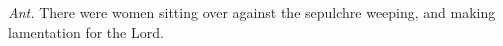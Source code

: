 \begin{Parallel}[v]{\colw}{\colx}
{}
{\vern
{\noindent
\textit{Ant.} There were women sitting over against the sepulchre weeping, and making lamentation for the Lord.}}

\end{Parallel}